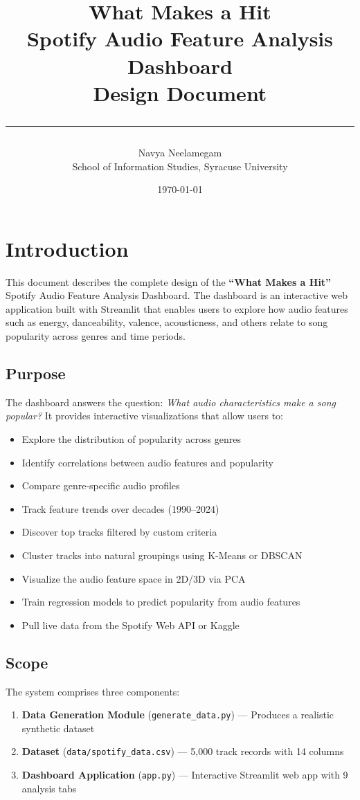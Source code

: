 \documentclass[12pt,a4paper]{article}
\title{
    \vspace{-1cm}
    {\Huge\bfseries\textcolor{spotifygreen!70!black}{What Makes a Hit}}\\[0.5em]
    {\Large Spotify Audio Feature Analysis Dashboard}\\[0.3em]
    {\large Design Document}\\[1em]
    \rule{\textwidth}{1.5pt}
}
\author{Navya Neelamegam\\School of Information Studies, Syracuse University}
\date{\today}
\begin{document}
\maketitle
\thispagestyle{fancy}

\tableofcontents
\newpage

\section{Introduction}

This document describes the complete design of the \textbf{``What Makes a Hit''} Spotify Audio Feature Analysis Dashboard. The dashboard is an interactive web application built with Streamlit that enables users to explore how audio features such as energy, danceability, valence, acousticness, and others relate to song popularity across genres and time periods.

\subsection{Purpose}
The dashboard answers the question: \emph{What audio characteristics make a song popular?} It provides interactive visualizations that allow users to:
\begin{itemize}[noitemsep]
    \item Explore the distribution of popularity across genres
    \item Identify correlations between audio features and popularity
    \item Compare genre-specific audio profiles
    \item Track feature trends over decades (1990--2024)
    \item Discover top tracks filtered by custom criteria
    \item Cluster tracks into natural groupings using K-Means or DBSCAN
    \item Visualize the audio feature space in 2D/3D via PCA
    \item Train regression models to predict popularity from audio features
    \item Pull live data from the Spotify Web API or Kaggle
\end{itemize}

\subsection{Scope}
The system comprises three components:
\begin{enumerate}[noitemsep]
    \item \textbf{Data Generation Module} (\texttt{generate\_data.py}) --- Produces a realistic synthetic dataset
    \item \textbf{Dataset} (\texttt{data/spotify\_data.csv}) --- 5{,}000 track records with 14 columns
    \item \textbf{Dashboard Application} (\texttt{app.py}) --- Interactive Streamlit web app with 9 analysis tabs
\end{enumerate}
\end{document}
